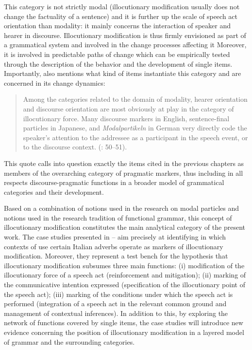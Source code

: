 This category is not strictly modal (illocutionary modification usually does not change the factuality of a sentence) and it is further up the scale of speech act orientation than modality: it mainly concerns the interaction of speaker and hearer in discourse. Illocutionary modification is thus firmly envisioned as part of a grammatical system and involved in the change processes affecting it Moreover, it is involved in predictable paths of change which can be empirically tested through the description of the behavior and the development of single items. Importantly, \citet{Narrog2012} also mentions what kind of items instantiate this category and are concerned in its change dynamics:

\begin{quote}
Among the categories related to the domain of modality, hearer orientation and discourse orientation are most obviously at play in the category of illocutionary force. Many discourse markers in English, sentence-final particles in Japanese, and \textit{Modalpartikeln} in German very directly code the speaker’s attention to the addressee as a participant in the speech event, or to the discourse context. (\citealt{Narrog2012}: 50–51).
\end{quote}

This quote calls into question exactly the items cited in the previous chapters as members of the overarching category of pragmatic markers, thus including in all respects discourse-pragmatic functions in a broader model of grammatical categories and their development.

Based on a combination of notions used in the research on modal particles and notions used in the research tradition of functional grammar, this concept of illocutionary modification constitutes the main analytical category of the present work. The case studies presented in -- aim precisely at identifying in which contexts of use certain Italian adverbs operate as markers of illocutionary modification. Moreover, they represent a test bench for the hypothesis that illocutionary modification subsumes three main functions: (i) modification of the illocutionary force of a speech act (reinforcement and mitigation); (ii) marking of the communicative intention expressed (specification of the illocutionary point of the speech act); (iii) marking of the conditions under which the speech act is performed (integration of a speech act in the relevant common ground and management of contextual inferences). In addition to this, by exploring the network of functions covered by single items, the case studies will introduce new evidence concerning the position of illocutionary modification in a layered model of grammar and the surrounding categories.
